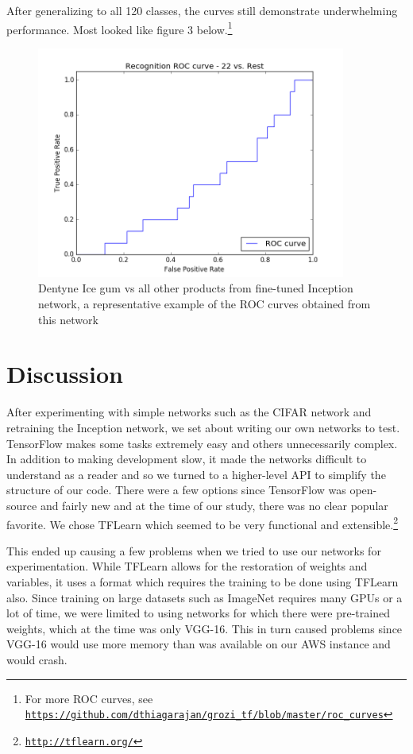 \documentclass[letterpaper, 11pt]{article}
\begin{document}
After generalizing to all 120 classes, the curves still demonstrate underwhelming performance. Most looked like figure 3 below.\footnote{For more ROC curves, see \texttt{\href{https://github.com/dthiagarajan/grozi_tf/blob/master/roc_curves}{https://github.com/dthiagarajan/grozi\_tf/blob/master/roc\_curves}}}

\begin{figure}[!ht]
	\centering
	\includegraphics[height=3in]{../roc_curves/roc_curve_22_vs_rest}
	\caption{Dentyne Ice gum vs all other products from fine-tuned Inception network, a representative example of the ROC curves obtained from this network}
\end{figure}

\section{Discussion}


After experimenting with simple networks such as the CIFAR network and retraining the Inception network, we set about writing our own networks to test. TensorFlow makes some tasks extremely easy and others unnecessarily complex. In addition to making development slow, it made the networks difficult to understand as a reader and so we turned to a higher-level API to simplify the structure of our code. There were a few options since TensorFlow was open-source and fairly new and at the time of our study, there was no clear popular favorite. We chose TFLearn which seemed to be very functional and extensible.\footnote{\texttt{\href{http://tflearn.org/}{http://tflearn.org/}}}

This ended up causing a few problems when we tried to use our networks for experimentation. While TFLearn allows for the restoration of weights and variables, it uses a format which requires the training to be done using TFLearn also. Since training on large datasets such as ImageNet requires many GPUs or a lot of time, we were limited to using networks for which there were pre-trained weights, which at the time was only VGG-16. This in turn caused problems since VGG-16 would use more memory than was available on our AWS instance and would crash.
\end{document}
